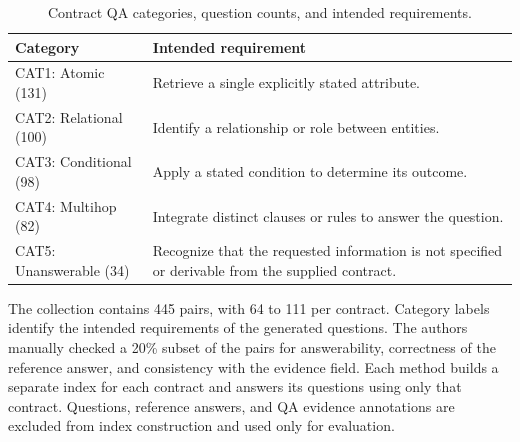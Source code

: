 \documentclass[sigconf, review, anonymous]{acmart}
\begin{document}
\begin{table}[t]
\centering
\caption{Contract QA categories, question counts, and intended requirements.}
\label{tab:contract_categories}
\small
\begin{tabularx}{\columnwidth}{@{}lX@{}}
\toprule
\rowcolor{UNHScoreBlue!8}
Category & Intended requirement \\
\midrule
CAT1: Atomic (131) & Retrieve a single explicitly stated attribute. \\
CAT2: Relational (100) & Identify a relationship or role between entities. \\
CAT3: Conditional (98) & Apply a stated condition to determine its outcome. \\
CAT4: Multihop (82) & Integrate distinct clauses or rules to answer the question. \\
CAT5: Unanswerable (34) & Recognize that the requested information is not specified or derivable from the supplied contract. \\
\bottomrule
\end{tabularx}
\end{table}

The collection contains 445 pairs, with 64 to 111 per contract. Category labels identify the intended requirements of the generated questions. The authors manually checked a 20\% subset of the pairs for answerability, correctness of the reference answer, and consistency with the evidence field. Each method builds a separate index for each contract and answers its questions using only that contract. Questions, reference answers, and QA evidence annotations are excluded from index construction and used only for evaluation. 
\end{document}
